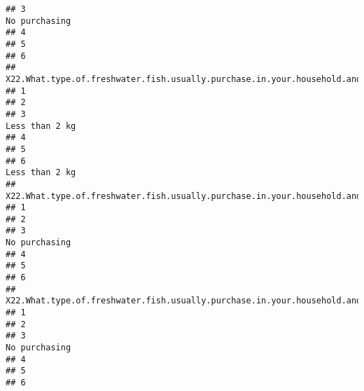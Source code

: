 \documentclass[
]{article}
\begin{document}
\begin{verbatim}
## 3                                                                                       No purchasing
## 4                                                                                                    
## 5                                                                                                    
## 6                                                                                                    
##   X22.What.type.of.freshwater.fish.usually.purchase.in.your.household.and.how.much.per.month...Loolla.
## 1                                                                                                     
## 2                                                                                                     
## 3                                                                                       Less than 2 kg
## 4                                                                                                     
## 5                                                                                                     
## 6                                                                                       Less than 2 kg
##   X22.What.type.of.freshwater.fish.usually.purchase.in.your.household.and.how.much.per.month...Pethiya.
## 1                                                                                                      
## 2                                                                                                      
## 3                                                                                         No purchasing
## 4                                                                                                      
## 5                                                                                                      
## 6                                                                                                      
##   X22.What.type.of.freshwater.fish.usually.purchase.in.your.household.and.how.much.per.month...Aandha.
## 1                                                                                                     
## 2                                                                                                     
## 3                                                                                        No purchasing
## 4                                                                                                     
## 5                                                                                                     
## 6                                                                                                     

\end{verbatim}
\end{document}
